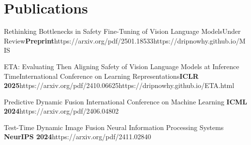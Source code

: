 \begin{comment}
\begin{publication}[<counter's Captial> (optional)]
      \item \pub{<authors>}{<title>}{<journal/conference name>}{<journal/conference name's abbreviation> (optional)}{<paper's url>}
\end{publication}
\end{comment}

\section{\texorpdfstring{Publications\hspace*{\fill}}{Publications (* denotes equal contribution)}}


\begin{publication}[P]
    \item {}
    {Rethinking Bottlenecks in Safety Fine-Tuning of Vision Language Models}{Under Review}{\textbf{Preprint}}{}{https://arxiv.org/pdf/2501.18533}{https://dripnowhy.github.io/MIS}
\end{publication}

\begin{publication}[C]
    \item {}
        {ETA: Evaluating Then Aligning Safety of Vision Language Models at Inference Time}{International Conference on Learning Representations}{\textbf{ICLR 2025}}{}{https://arxiv.org/pdf/2410.06625}{https://dripnowhy.github.io/ETA.html}
    \item {}%
    {Predictive Dynamic Fusion}%
    {International Conference on Machine Learning}%
    {\textbf{ICML 2024}}{}{https://arxiv.org/pdf/2406.04802}{}
    \item {}%
    {Test-Time Dynamic Image Fusion}%
    {Neural Information Processing Systems}%
    {\textbf{NeurIPS 2024}}{}{https://arxiv.org/pdf/2411.02840}{}
\end{publication}